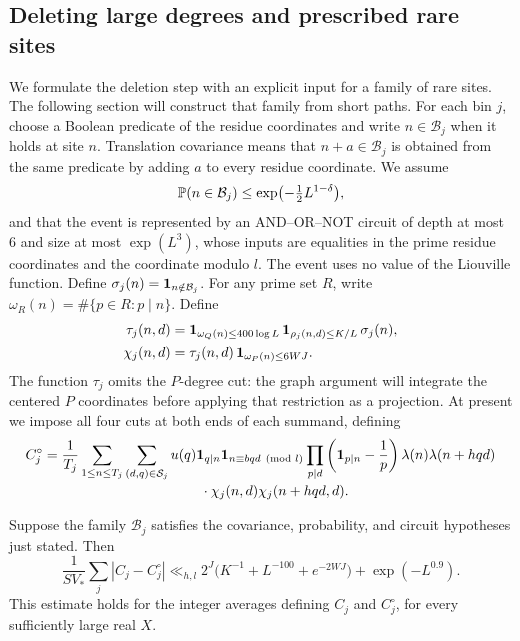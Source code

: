 \subsection{Deleting large degrees and prescribed rare sites}

We formulate the deletion step with an explicit input for a family of rare
sites.  The following section will construct that family from short
paths.  For each bin $j$, choose a Boolean predicate of the residue coordinates
and write $n\in\mathcal B_j$ when it holds at site $n$.  Translation
covariance means that $n+a\in\mathcal B_j$ is obtained from the same
predicate by adding $a$ to every residue coordinate.  We assume
\begin{equation}\label{q:rare-input}
 \mathbb P(n\in\mathcal B_j)\le
           \exp\bigl(-\tfrac12L^{1-\delta}\bigr),
\end{equation}
and that the event is represented by an AND--OR--NOT circuit of depth at
most $6$ and size at most $\exp(L^3)$, whose inputs are equalities in the
prime residue coordinates and the coordinate modulo $l$.
The event uses no value of the Liouville function.  Define
$\sigma_j(n)=\mathbf 1_{n\notin\mathcal B_j}$.  For any prime set $R$,
write $\omega_R(n)=\#\{p\in R:p\mid n\}$.  Define
\begin{align}
 \tau_j(n,d)&=
 \mathbf 1_{\omega_Q(n)\le400\log L}\,
 \mathbf 1_{\rho_j(n,d)\le K/L}\,\sigma_j(n),\notag\\
 \chi_j(n,d)&=
 \tau_j(n,d)\,\mathbf 1_{\omega_P(n)\le6WJ}.
 \label{q:tau}
\end{align}
The function $\tau_j$ omits the $P$-degree cut: the graph argument will
integrate the centered $P$ coordinates before applying that restriction
as a projection. At present we impose all four cuts at
both ends of each summand, defining
\begin{align}
 C_j^\circ={}&\frac1{T_j}\sum_{1\le n\le T_j}
 \sum_{(d,q)\in\mathcal S_j}
 u(q)\1_{q\mid n}\1_{n\equiv bqd\pmod l}
 \prod_{p\mid d}\left(\1_{p\mid n}-\frac1p\right)
 \lambda(n)\lambda(n+hqd)\notag\\[-2pt]
 &\hspace{35mm}\cdot\chi_j(n,d)\chi_j(n+hqd,d).
 \label{q:cut-averages}
\end{align}

\begin{lemma}\label{q:cuts}
Suppose the family $\mathcal B_j$ satisfies the covariance, probability,
and circuit hypotheses just stated.  Then
\begin{equation}\label{q:cuts-bound}
 \frac1{SV_*}\sum_j|C_j-C_j^\circ|
 \ll_{h,l}
 2^J\bigl(K^{-1}+L^{-100}+e^{-2WJ}\bigr)
       +\exp(-L^{0.9}).
\end{equation}
This estimate holds for the integer averages defining $C_j$ and
$C_j^\circ$, for every sufficiently large real $X$.
\end{lemma}

